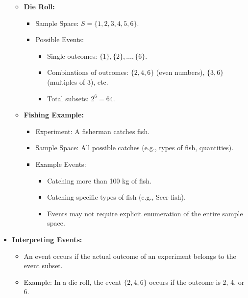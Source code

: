 \documentclass{article}
\begin{document}
\begin{itemize}
\begin{itemize}
      \item \textbf{Die Roll:}
        \begin{itemize}
          \item Sample Space: $S = \{1, 2, 3, 4, 5, 6\}$.
          \item Possible Events:
            \begin{itemize}
              \item Single outcomes: $\{1\}, \{2\}, \dots, \{6\}$.
              \item Combinations of outcomes: $\{2, 4, 6\}$ (even numbers), $\{3, 6\}$ (multiples of 3), etc.
              \item Total subsets: $2^6 = 64$.
            \end{itemize}
        \end{itemize}

      \item \textbf{Fishing Example:}
        \begin{itemize}
          \item Experiment: A fisherman catches fish.
          \item Sample Space: All possible catches (e.g., types of fish, quantities).
          \item Example Events:
            \begin{itemize}
              \item Catching more than 100 kg of fish.
              \item Catching specific types of fish (e.g., Seer fish).
              \item Events may not require explicit enumeration of the entire sample space.
            \end{itemize}
        \end{itemize}
    \end{itemize}

  \item \textbf{Interpreting Events:}
    \begin{itemize}
      \item An event occurs if the actual outcome of an experiment belongs to the event subset.
      \item Example: In a die roll, the event $\{2, 4, 6\}$ occurs if the outcome is 2, 4, or 6.
    \end{itemize}


\end{itemize}
\end{document}
